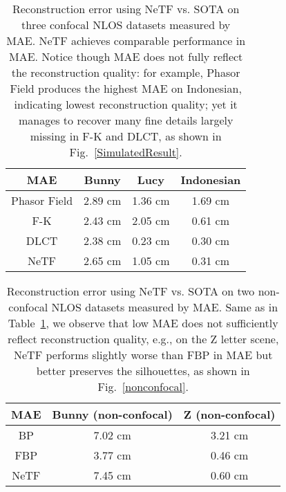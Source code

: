 \documentclass[10pt,journal,compsoc]{IEEEtran}
\begin{document}
\begin{table}[!t]
\renewcommand\arraystretch{1.3}
\centering
\caption{Reconstruction error using NeTF vs. SOTA on three confocal NLOS datasets measured by MAE. NeTF achieves comparable performance in MAE. Notice though MAE does not fully reflect the reconstruction quality: for example, Phasor Field produces the highest MAE on Indonesian, indicating lowest reconstruction quality; yet it manages to recover many fine details largely missing in F-K and DLCT, as shown in Fig.~\ref{SimulatedResult}.}
\begin{tabular}{|c|c|c|c|} %
\hline
MAE & Bunny & Lucy & Indonesian\\ 
\hline      
Phasor Field & 2.89 cm & 1.36 cm & 1.69 cm \\
\hline
F-K  & 2.43 cm & 2.05 cm & 0.61 cm\\
\hline
DLCT & 2.38 cm & 0.23 cm & 0.30 cm\\
\hline
NeTF & 2.65 cm & 1.05 cm & 0.31 cm\\
\hline
\end{tabular}
\label{table1}

\end{table}

\begin{table}[!t]
\renewcommand\arraystretch{1.3}
\centering
\caption{Reconstruction error using NeTF vs. SOTA on two non-confocal NLOS datasets measured by MAE. Same as in Table~\ref{table1}, we observe that low MAE does not sufficiently reflect reconstruction quality, e.g., on the Z letter scene, NeTF performs slightly worse than FBP in MAE but better preserves the silhouettes, as shown in Fig.~\ref{nonconfocal}.}
    \begin{tabular}{|c|c|c|} %
    \hline
    MAE & Bunny (non-confocal) & Z (non-confocal) \\ 
    \hline
    BP & 7.02 cm & 3.21 cm \\
    \hline
    FBP  & 3.77 cm & 0.46 cm \\
    \hline
    NeTF & 7.45 cm & 0.60 cm \\
    \hline
    \end{tabular}
    \label{table2}

\end{table}
\end{document}
